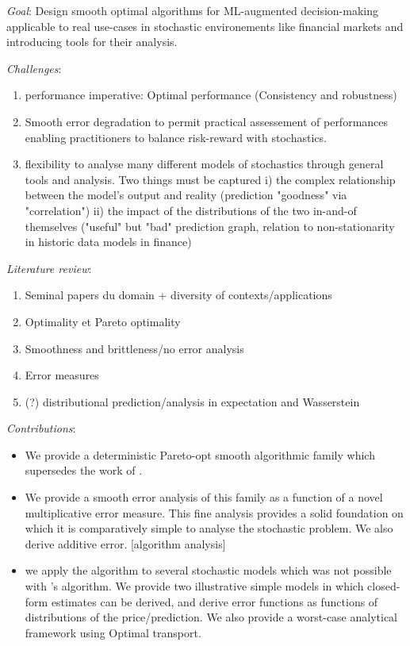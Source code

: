 \textit{Goal}: Design smooth optimal algorithms for ML-augmented decision-making applicable to real use-cases in stochastic environements like financial markets and introducing tools for their analysis.

\textit{Challenges}:
\begin{enumerate}
    \item performance imperative: Optimal performance (Consistency and robustness)
    \item Smooth error degradation to permit practical assessement of performances enabling practitioners to balance risk-reward with stochastics. 
    \item flexibility to analyse many different models of stochastics through general tools and analysis. Two things must be captured i) the complex relationship between the model's output and reality (prediction "goodness" via  "correlation") ii) the impact of the distributions of the two in-and-of themselves ("useful" but "bad" prediction graph, relation to non-stationarity in historic data models in finance)
\end{enumerate}





\textit{Literature review}:
\begin{enumerate}
    \item Seminal papers du domain + diversity of contexts/applications
    \item Optimality et Pareto optimality
    \item Smoothness and brittleness/no error analysis
    \item Error measures 
    \item (?) distributional prediction/analysis in expectation and Wasserstein 
\end{enumerate}

\textit{Contributions}:
\begin{itemize}
    \item We provide a deterministic Pareto-opt smooth algorithmic family which supersedes the work of \cite{sun_online_2024}.
    \item We provide a smooth error analysis of this family as a function of a novel multiplicative error measure. This fine analysis provides a solid foundation on which it is comparatively simple to analyse the stochastic problem. We also derive additive error. [algorithm analysis]
    \item we apply the algorithm to several stochastic models which was not possible with \cite{sun_online_2024}'s algorithm. We provide two illustrative simple models in which closed-form estimates can be derived, and derive error functions as functions of distributions of the price/prediction. We also provide a worst-case analytical framework using Optimal transport.
\end{itemize}

